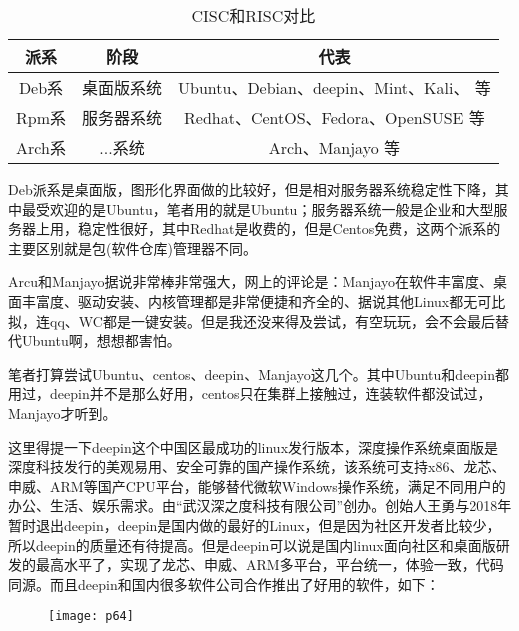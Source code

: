 \documentclass[utf8]{book}
\begin{document}
	\begin{table}[H]
	\caption{\small{CISC和RISC对比}}
	\centering
	\begin{tabular}{ccc}
		\hline
		\rowcolor{lightgray}
		\textbf{派系} & \textbf{阶段} & \textbf{代表} \\
		\hline
		Deb系 & 桌面版系统 &  Ubuntu、Debian、deepin、Mint、Kali、 等\\		
		Rpm系 & 服务器系统 & Redhat、CentOS、Fedora、OpenSUSE 等\\
		
		Arch系 & ...系统 & Arch、Manjayo 等\\
		\hline
	\end{tabular}
	\end{table}
	
	Deb派系是桌面版，图形化界面做的比较好，但是相对服务器系统稳定性下降，其中最受欢迎的是Ubuntu，笔者用的就是Ubuntu；服务器系统一般是企业和大型服务器上用，稳定性很好，其中Redhat是收费的，但是Centos免费，这两个派系的主要区别就是包(软件仓库)管理器不同。
	
	Arcu和Manjayo据说非常棒非常强大，网上的评论是：Manjayo在软件丰富度、桌面丰富度、驱动安装、内核管理都是非常便捷和齐全的、据说其他Linux都无可比拟，连qq、WC都是一键安装。但是我还没来得及尝试，有空玩玩，会不会最后替代Ubuntu啊，想想都害怕。
	
	笔者打算尝试Ubuntu、centos、deepin、Manjayo这几个。其中Ubuntu和deepin都用过，deepin并不是那么好用，centos只在集群上接触过，连装软件都没试过，Manjayo才听到。

	这里得提一下deepin这个中国区最成功的linux发行版本，深度操作系统桌面版是深度科技发行的美观易用、安全可靠的国产操作系统，该系统可支持x86、龙芯、申威、ARM等国产CPU平台，能够替代微软Windows操作系统，满足不同用户的办公、生活、娱乐需求。由“武汉深之度科技有限公司”创办。创始人王勇与2018年暂时退出deepin，deepin是国内做的最好的Linux，但是因为社区开发者比较少，所以deepin的质量还有待提高。但是deepin可以说是国内linux面向社区和桌面版研发的最高水平了，实现了龙芯、申威、ARM多平台，平台统一，体验一致，代码同源。而且deepin和国内很多软件公司合作推出了好用的软件，如下：
	\begin{figure}[H]
		\centering
		\texttt{[image: p64]}
	\end{figure}
\end{document}
